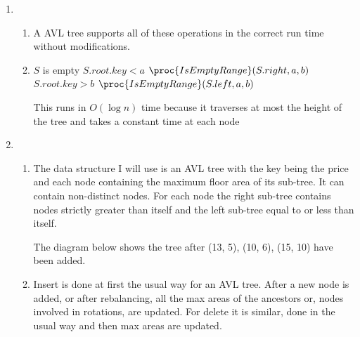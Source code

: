 \documentclass[10pt,a4paper]{article}
\begin{document}
\begin{enumerate}
\begin{enumerate}
$m_2 = 3 > 1.96 - 1$

$m_3 = 5 > 2.744 - 1$

$m_4 = 8 > 3.8416 - 1$

Assume that it is true for some $m_h$ where 
$h > 4$

Then $m_{h+1} = m_h + m_{h-1} - m_{h-5} \geq 1.4^h - 1 + 1.4^{h-1} - 1 - 1.4^{h-5} + 1 = 1.4^{h}(1+ 1.4^{-1} - 1.4^{-5}) - 1 > 1.4^h(1+ 0.7 - 0.18) -1 > 1.4^h(1.4) - 1 = 1.4^{h+1} -1$

\end{enumerate}
\item
\begin{enumerate}
\item A AVL tree supports all of these operations in the correct run time without modifications. 
\item 
\begin{codebox}
\li \If $S$ is empty
\zi \Then
\li		\Return {}
	\End 
\li \If $S.root.key < a$	
\zi \Then
\li			\Return $\proc{IsEmptyRange}(S.right, a, b)$
\li \ElseIf $S.root.key > b$
\zi	\Then 
\li 		\Return $\proc{IsEmptyRange}(S.left, a, b)$
\End
\li 	\Return {}
	

\end{codebox}

This runs in $O(\log n)$ time because it traverses at most the height of the tree and takes a constant time at each node
\end{enumerate}
\item
\begin{enumerate}
\item The data structure I will use is an AVL tree with the key being the price and each node containing the maximum floor area of its sub-tree. It can contain non-distinct nodes. For each node the right sub-tree contains nodes strictly greater than itself and the left sub-tree equal to or less than itself.

The diagram below shows the tree after (13, 5), (10, 6), (15, 10) have been added.

\item Insert is done at first the usual way for an AVL tree. After a new node is added, or after rebalancing, all the max areas of the ancestors or, nodes involved in rotations, are updated. For delete it is similar, done in the usual way and then max areas are updated.


\end{enumerate}
\end{enumerate}
\end{document}
